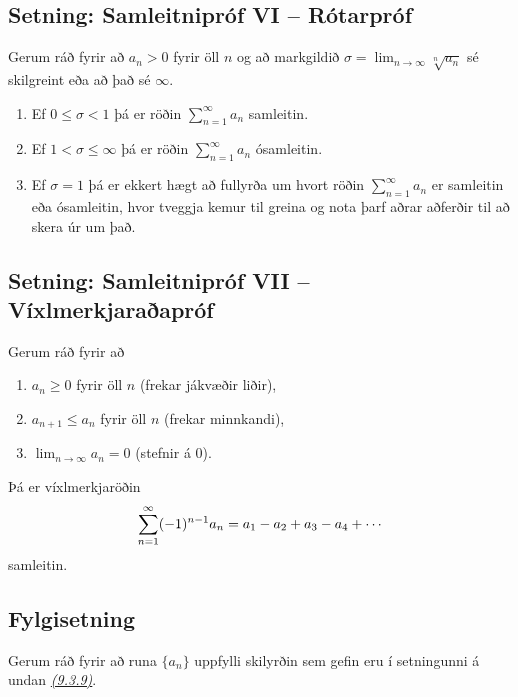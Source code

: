 \documentclass[a4paper,10pt,icelandic]{sphinxmanual}
\begin{document}
\subsection{Setning: Samleitnipróf VI – Rótarpróf}
\label{kafli09:setning-samleitniprof-vi-rotarprof}
Gerum ráð fyrir að \(a_n>0\) fyrir öll \(n\) og að markgildið
\(\sigma=\lim_{n\rightarrow\infty}\sqrt[n]{a_n}\) sé skilgreint eða
að það sé \(\infty\).
\begin{enumerate}
\item {} 
Ef \(0\leq\sigma<1\) þá er röðin \(\sum_{n=1}^\infty a_n\)
samleitin.

\item {} 
Ef \(1<\sigma\leq \infty\) þá er röðin
\(\sum_{n=1}^\infty a_n\) ósamleitin.

\item {} 
Ef \(\sigma=1\) þá er ekkert hægt að fullyrða um hvort röðin
\(\sum_{n=1}^\infty a_n\) er samleitin eða ósamleitin, hvor
tveggja kemur til greina og nota þarf aðrar aðferðir til að skera
úr um það.

\end{enumerate}


\subsection{Setning: Samleitnipróf VII – Víxlmerkjaraðapróf}
\label{kafli09:setning-samleitniprof-vii-vixlmerkjaraaprof}\label{kafli09:vixlmerkjaprof}
Gerum ráð fyrir að
\begin{enumerate}
\item {} 
\(a_n\geq 0\) fyrir öll \(n\) (frekar jákvæðir liðir),

\item {} 
\(a_{n+1}\leq a_n\) fyrir öll \(n\) (frekar minnkandi),

\item {} 
\(\lim_{n\rightarrow\infty} a_n=0\) (stefnir á 0).

\end{enumerate}

Þá er víxlmerkjaröðin
\begin{gather}
\begin{split}\sum_{n=1}^\infty (-1)^{n-1}a_n=a_1-a_2+a_3-a_4+\cdots\end{split}\notag
\end{gather}
samleitin.


\subsection{Fylgisetning}
\label{kafli09:id11}
Gerum ráð fyrir að runa \(\{a_n\}\) uppfylli skilyrðin sem gefin eru
í setningunni á undan {\hyperref[kafli09:vixlmerkjaprof]{\emph{(9.3.9)}}}.
\end{document}

